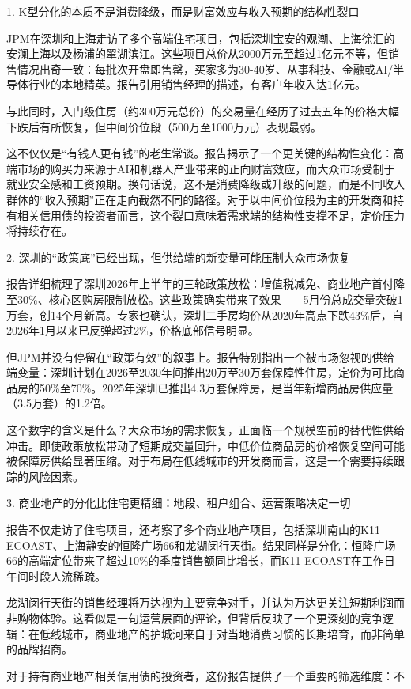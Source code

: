 \documentclass[11pt]{ctexart}
\begin{document}
1. K型分化的本质不是消费降级，而是财富效应与收入预期的结构性裂口

JPM在深圳和上海走访了多个高端住宅项目，包括深圳宝安的观潮、上海徐汇的安澜上海以及杨浦的翠湖滨江。这些项目总价从2000万元至超过1亿元不等，但销售情况出奇一致：每批次开盘即售罄，买家多为30-40岁、从事科技、金融或AI/半导体行业的本地精英。报告引用销售经理的描述，有客户年收入达1亿元。

与此同时，入门级住房（约300万元总价）的交易量在经历了过去五年的价格大幅下跌后有所恢复，但中间价位段（500万至1000万元）表现最弱。

这不仅仅是“有钱人更有钱”的老生常谈。报告揭示了一个更关键的结构性变化：高端市场的购买力来源于AI和机器人产业带来的正向财富效应，而大众市场受制于就业安全感和工资预期。换句话说，这不是消费降级或升级的问题，而是不同收入群体的“收入预期”正在走向截然不同的路径。对于以中间价位段为主的开发商和持有相关信用债的投资者而言，这个裂口意味着需求端的结构性支撑不足，定价压力将持续存在。

2. 深圳的“政策底”已经出现，但供给端的新变量可能压制大众市场恢复

报告详细梳理了深圳2026年上半年的三轮政策放松：增值税减免、商业地产首付降至30\%、核心区购房限制放松。这些政策确实带来了效果——5月份总成交量突破1万套，创14个月新高。专家也确认，深圳二手房均价从2020年高点下跌43\%后，自2026年1月以来已反弹超过2\%，价格底部信号明显。

但JPM并没有停留在“政策有效”的叙事上。报告特别指出一个被市场忽视的供给端变量：深圳计划在2026至2030年间推出20万至30万套保障性住房，定价为可比商品房的50\%至70\%。2025年深圳已推出4.3万套保障房，是当年新增商品房供应量（3.5万套）的1.2倍。

这个数字的含义是什么？大众市场的需求恢复，正面临一个规模空前的替代性供给冲击。即使政策放松带动了短期成交量回升，中低价位商品房的价格恢复空间可能被保障房供给显著压缩。对于布局在低线城市的开发商而言，这是一个需要持续跟踪的风险因素。

3. 商业地产的分化比住宅更精细：地段、租户组合、运营策略决定一切

报告不仅走访了住宅项目，还考察了多个商业地产项目，包括深圳南山的K11 ECOAST、上海静安的恒隆广场66和龙湖闵行天街。结果同样是分化：恒隆广场66的高端定位带来了超过10\%的季度销售额同比增长，而K11 ECOAST在工作日午间时段人流稀疏。

龙湖闵行天街的销售经理将万达视为主要竞争对手，并认为万达更关注短期利润而非购物体验。这看似是一句运营层面的评论，但背后反映了一个更深刻的竞争逻辑：在低线城市，商业地产的护城河来自于对当地消费习惯的长期培育，而非简单的品牌招商。

对于持有商业地产相关信用债的投资者，这份报告提供了一个重要的筛选维度：不
\end{document}
